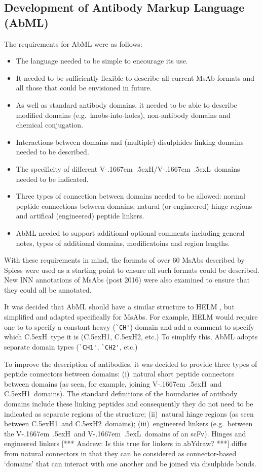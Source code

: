 \documentclass[a4]{article}
\newcommand{\VH}{\mbox{V\kern-.1667em \lower.5ex\hbox{\scriptsize H}}}
\newcommand{\VL}{\mbox{V\kern-.1667em \lower.5ex\hbox{\scriptsize L}}}
\newcommand{\VHVL}{\mbox{\VH/\VL}}
\newcommand{\CH}[1]{\mbox{C\lower.5ex\hbox{\scriptsize H}#1}}
\newcommand{\andrew}[1]{{\color{red} [*** Andrew: #1 ***]}}
\let\shortcite\cite
\begin{document}
\subsection{Development of Antibody Markup Language (AbML)}
The requirements for AbML were as follows:
\begin{itemize}
\item The language needed to be simple to encourage its use.
\item It needed to be sufficiently flexible to describe all current
  MsAb formats and all those that could be envisioned in future.
\item As well as standard antibody domains, it needed to be able to
  describe modified domains (e.g.\ knobs-into-holes), non-antibody
  domains and chemical conjugation.
\item Interactions between domains and (multiple) disulphides linking
  domains needed to be described.
\item The specificity of different \VHVL\ domains needed to be
  indicated.
\item Three types of connection between domains needed to be allowed:
  normal peptide connections between domains, natural (or engineered)
  hinge regions and artifical (engineered) peptide linkers.
\item AbML needed to support additional optional comments including
  general notes, types of additional domains, modificatoins and region
  lengths.
\end{itemize}
  
With these requirements in mind, the formats of over 60 MsAbs
described by Spiess \shortcite{spiess:2015} were used as a starting
point to ensure all such formats could be described. New INN
annotations of MsAbs (post 2016) were also examined to ensure that
they could all be annotated.

It was decided that AbML should have a similar structure to HELM
\cite{zhang:2012}, but simplified and adapted specifically for MsAbs.
For example, HELM would require one to
to specify a constant heavy (\verb|`CH'|) domain and add a
comment to specify which \CH\ type it is (\CH{1}, \CH{2}, etc.)
To simplify this, AbML adopts separate domain types (\verb|`CH1'|,
\verb|`CH2'|, etc.)

To improve the description of antibodies, it was decided to provide
three types of peptide connectors between domains: (i)~natural short
peptide connectors between domains (as seen, for example, joining \VH\
and \CH1\ domains). The standard definitions of the boundaries of
antibody domains include these linking peptides and consequently they
do not need to be indicated as separate regions of the structure;
(ii)~natural hinge regions (as seen between \CH1\ and \CH2\ domains);
(iii)~engineered linkers (e.g.\ between the \VH\ and \VL\ domains of
an scFv). Hinges and engineered linkers \andrew{Is this true for
  linkers in abYdraw?} differ from natural connectors in that they can
be considered as connector-based `domains' that can interact with one
another and be joined via disulphide bonds.
\end{document}
